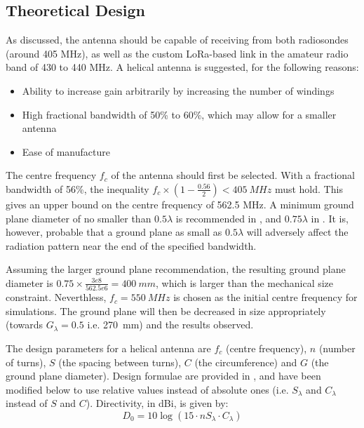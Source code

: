 \subsection{Theoretical Design}
As discussed, the antenna should be capable of receiving from both radiosondes (around 405 MHz), as well as the custom LoRa-based link in the amateur radio band of 430 to 440 MHz. A helical antenna is suggested, for the following reasons:
\begin{itemize}
    \item Ability to increase gain arbitrarily by increasing the number of windings
    \item High fractional bandwidth of 50\% to 60\%, which may allow for a smaller antenna
    \item Ease of manufacture
\end{itemize}

The centre frequency $f_c$ of the antenna should first be selected. With a fractional bandwidth of 56\%, the inequality $f_c \times (1 - \frac{0.56}{2}) < \SI{405}{MHz}$ must hold. This gives an upper bound on the centre frequency of 562.5 MHz. A minimum ground plane diameter of no smaller than $0.5 \lambda$ is recommended in \cite{textbook-antennaTheoryAnalysisDesign}, and $0.75 \lambda$ in \cite{textbook-helicalAntenna}. It is, however, probable that a ground plane as small as $0.5 \lambda$ will adversely affect the radiation pattern near the end of the specified bandwidth.

Assuming the larger ground plane recommendation, the resulting ground plane diameter is $0.75 \times \frac{3e8}{562.5e6} = \SI{400}{mm}$, which is larger than the mechanical size constraint. Neverthless, $f_c = \SI{550}{MHz}$ is chosen as the initial centre frequency for simulations. The ground plane will then be decreased in size appropriately (towards $G_\lambda = 0.5$ i.e. \SI{270}{mm}) and the results observed.

The design parameters for a helical antenna are $f_c$ (centre frequency), $n$ (number of turns), $S$ (the spacing between turns), $C$ (the circumference) and $G$ (the ground plane diameter). Design formulae are provided in \cite{textbook-antennaTheoryAnalysisDesign}, and have been modified below to use relative values instead of absolute ones (i.e. $S_\lambda$ and $C_\lambda$ instead of $S$ and $C$). Directivity, in dBi, is given by:
$$
D_0 = 10 \log(15 \cdot n S_\lambda \cdot C_\lambda)
$$

